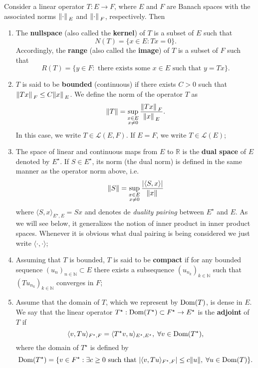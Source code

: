 \begin{definition}\label{banach_op_def}
    Consider a linear operator \(T: E \rightarrow F\), where \(E\) and \(F\) are Banach spaces with the associated norms \(\norm*{\cdot}_E\) and \(\norm*{\cdot}_F\), respectively. Then
    \begin{enumerate}
        \item The \textbf{nullspace} (also called the \textbf{kernel}) of \(T\) is a subset of \(E\) such that
        \[
            N(T) = \{x \in E: Tx = 0\}.
        \]
        Accordingly, the \textbf{range} (also called the \textbf{image}) of \(T\) is a subset of \(F\) such that
        \[
            R(T) = \{y \in F: \text{ there exists some } x \in E \text{ such that } y = Tx\}.
        \]
        \item \(T\) is said to be \textbf{bounded} (continuous) if there exists \(C > 0\) such that \(\norm*{Tx}_F \leq C \norm*{x}_E\). We define the norm of the operator \(T\) as
        \[
            \norm{T} = \sup_{\substack{x \in E\\ x \neq 0}}\frac{\norm*{Tx}_F}{\norm*{x}_E}.
        \]
        In this case, we write \(T \in \mathcal{L}(E, F)\). If \(E=F\), we write \(T \in \mathcal{L}(E)\);

        \item The space of linear and continuous maps from \(E\) to \(\mathbb{R}\) is the \textbf{dual space} of \(E\) denoted by \(E^\star\). If \(S \in E^\star\), its norm (the dual norm) is defined in the same manner as the operator norm above, i.e.
        \[
            \norm{S} = \sup_{\substack{x \in E\\ x \neq 0}}\frac{\abs{\langle S, x \rangle}}{\norm*{x}}
        \]
        where \(\langle S, x \rangle_{E^\star, E} = Sx\) and denotes de \textit{duality pairing} between \(E^\star\) and \(E\). As we will see below, it generalizes the notion of inner product in inner product spaces. Whenever it is obvious what dual pairing is being considered we just write \(\langle \cdot, \cdot \rangle\);        
        \item Assuming that \(T\) is bounded, \(T\) is said to be \textbf{compact} if for any bounded sequence \((u_n)_{n \in \mathbb{N}} \subset E\) there exists a subsequence \((u_{n_k})_{k \in \mathbb{N}}\) such that \((T u_{n_k})_{k \in \mathbb{N}}\) converges in \(F\);
        \item Assume that the domain of \(T\), which we represent by \(\operatorname{Dom}(T)\), is dense in \(E\). We say that the linear operator \(T^\star: \operatorname{Dom}(T^\star) \subset F^\star \rightarrow E^\star\) is the \textbf{adjoint} of \(T\) if 
        \[
            \langle v, T u \rangle_{F^\star, F} = \langle T^\star v, u \rangle_{E^\star, E^\star}, \; \forall v \in \operatorname{Dom}(T^\star),
        \]
        where the domain of \(T^\star\) is defined by
        \[
            \operatorname{Dom}(T^\star) = \{v \in F^\star: \exists c \geq 0 \text{ such that } \abs{\langle v, T u \rangle_{F^\star, F}} \leq c \norm{u}, \; \forall u \in \operatorname{Dom}(T)\}.
        \]
    \end{enumerate}
\end{definition}

